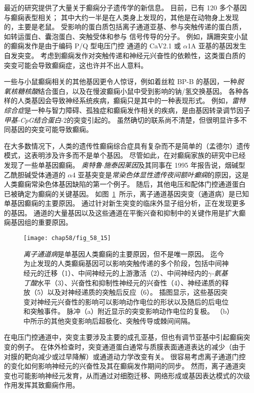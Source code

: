 最近的研究提供了大量关于癫痫分子遗传学的新信息。
目前，已有 120 多个基因与癫痫表型相关；
其中大约一半是在人类身上发现的，其他是在动物身上发现的，主要是老鼠。
受影响的蛋白质包括离子通道亚基、参与突触传递的蛋白质，如转运蛋白、囊泡蛋白、突触受体和参与  信号传导的分子。
例如，蹒跚突变小鼠的癫痫发作是由于编码 P/Q 型电压门控  通道的 CaV2.1 或 $\alpha$1A 亚基的基因发生自发突变。
考虑到癫痫发作对突触传递和神经元兴奋性的依赖性，这类蛋白质的突变可能会导致癫痫症，这也许并不出人意料。


一些与小鼠癫痫相关的其他基因更令人惊讶，例如着丝粒 BP-B 的基因，一种\textit{脱氧核糖核酸}结合蛋白，以及在慢波癫痫小鼠中受到影响的钠/氢交换基因。
各种各样的人类基因会导致神经系统疾病，癫痫只是其中的一种表现形式。
例如，\textit{雷特综合症}是一种与智力障碍、孤独症和癫痫发作相关的疾病，是由基因转录调节因子\textit{甲基-CpG结合蛋白}-2的突变引起的。
虽然确切的联系尚不清楚，但很明显许多不同基因的突变可能导致癫痫。


在大多数情况下，人类的遗传性癫痫综合症具有复杂而不是简单的（孟德尔）遗传模式，这表明涉及许多而不是单个基因。
尽管如此，在对癫痫家族的研究中已经发现了一些单基因癫痫。
\textit{奥特鲁$\cdot$施泰因莱因}及其同事在 1995 年报告说，烟碱型乙酰胆碱受体通道的 $\alpha$4 亚基突变是\textit{常染色体显性遗传夜间额叶癫痫}的原因，这是人类癫痫常染色体基因缺陷的第一个例子。
随后，其他电压和配体门控通道蛋白已被确定为癫痫的关键基因。
如图~\ref{fig:58_15}~所示，离子通道基因突变（通道病）是已知单基因癫痫的主要原因。
通过针对新生突变的临床外显子组分析，正在发现更多的基因。
 通道的大量基因以及这些通道在平衡兴奋和抑制中的关键作用是扩大癫痫基因组的重要原因。


\begin{figure}[htbp]
	\centering
	\texttt{[image: chap58/fig\_58\_15]}
	\caption{\textit{离子通道病}是单基因人类癫痫的主要原因，但不是唯一原因。
		迄今为止发现的人类癫痫基因可以影响突触传递的多个阶段，包括中间神经元的迁移（1）、中间神经元的上游激活（2）、中间神经内的\textit{$\gamma$-氨基丁酸}水平（3）、兴奋性和抑制性神经元的兴奋性（4）、神经递质的释放（5）以及对神经递质的突触后反应（6）。
		插图显示，这些基因突变对神经元兴奋性的影响可以影响动作电位的形状以及随后的后电位和突触事件。
		脉冲（a）附近显示的突变影响动作电位的复极。
		（b）中所示的其他突变影响后超极化、突触传导或棘间间隔。}
	\label{fig:58_15}
\end{figure}


在电压门控通道中，突变主要涉及主要的成孔亚基，但也有调节亚基中引起癫痫突变的例子。
在体外检查时，突变通道蛋白通常与质膜表面通道表达的减少（由于对膜的靶向减少或过早降解）或通道动力学改变有关。
很容易考虑离子通道门控的变化如何影响神经元的兴奋性及其在癫痫发作期间的同步。
然而，离子通道突变也可能影响神经元发育，从而通过对细胞迁移、网络形成或基因表达模式的次级作用发挥其致癫痫作用。


